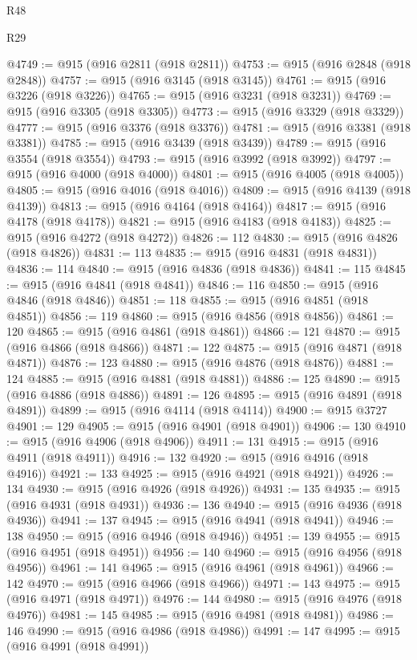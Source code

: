 \begin{lexlean}{R48}
\begin{lexlean}{R29}
\begin{coremodule}
{{{{{{{{{{{{{{{{{{{{{{{{{{{{{{{{{{{{{{{{{{{{{{{{{{{{{{{{{{{{{{{{{{{{{{{{{{{{{{{{{{{{{{{{{{{{{{{{{{{{{{{{{{{{{{{{{{{{{{{{{{{{{{{{{{{{{{{{{{{{{{{{{{{{{{{{{{{{{{{{{{{{{{{{{{{{{{{{{{{{{{{{{{{{{{{{{{{{{{{{{{{{{{{{{{{{{{{{{{@4749 := @915 (@916 @2811 (@918 @2811))
@4753 := @915 (@916 @2848 (@918 @2848))
@4757 := @915 (@916 @3145 (@918 @3145))
@4761 := @915 (@916 @3226 (@918 @3226))
@4765 := @915 (@916 @3231 (@918 @3231))
@4769 := @915 (@916 @3305 (@918 @3305))
@4773 := @915 (@916 @3329 (@918 @3329))
@4777 := @915 (@916 @3376 (@918 @3376))
@4781 := @915 (@916 @3381 (@918 @3381))
@4785 := @915 (@916 @3439 (@918 @3439))
@4789 := @915 (@916 @3554 (@918 @3554))
@4793 := @915 (@916 @3992 (@918 @3992))
@4797 := @915 (@916 @4000 (@918 @4000))
@4801 := @915 (@916 @4005 (@918 @4005))
@4805 := @915 (@916 @4016 (@918 @4016))
@4809 := @915 (@916 @4139 (@918 @4139))
@4813 := @915 (@916 @4164 (@918 @4164))
@4817 := @915 (@916 @4178 (@918 @4178))
@4821 := @915 (@916 @4183 (@918 @4183))
@4825 := @915 (@916 @4272 (@918 @4272))
@4826 := 112
@4830 := @915 (@916 @4826 (@918 @4826))
@4831 := 113
@4835 := @915 (@916 @4831 (@918 @4831))
@4836 := 114
@4840 := @915 (@916 @4836 (@918 @4836))
@4841 := 115
@4845 := @915 (@916 @4841 (@918 @4841))
@4846 := 116
@4850 := @915 (@916 @4846 (@918 @4846))
@4851 := 118
@4855 := @915 (@916 @4851 (@918 @4851))
@4856 := 119
@4860 := @915 (@916 @4856 (@918 @4856))
@4861 := 120
@4865 := @915 (@916 @4861 (@918 @4861))
@4866 := 121
@4870 := @915 (@916 @4866 (@918 @4866))
@4871 := 122
@4875 := @915 (@916 @4871 (@918 @4871))
@4876 := 123
@4880 := @915 (@916 @4876 (@918 @4876))
@4881 := 124
@4885 := @915 (@916 @4881 (@918 @4881))
@4886 := 125
@4890 := @915 (@916 @4886 (@918 @4886))
@4891 := 126
@4895 := @915 (@916 @4891 (@918 @4891))
@4899 := @915 (@916 @4114 (@918 @4114))
@4900 := @915 @3727
@4901 := 129
@4905 := @915 (@916 @4901 (@918 @4901))
@4906 := 130
@4910 := @915 (@916 @4906 (@918 @4906))
@4911 := 131
@4915 := @915 (@916 @4911 (@918 @4911))
@4916 := 132
@4920 := @915 (@916 @4916 (@918 @4916))
@4921 := 133
@4925 := @915 (@916 @4921 (@918 @4921))
@4926 := 134
@4930 := @915 (@916 @4926 (@918 @4926))
@4931 := 135
@4935 := @915 (@916 @4931 (@918 @4931))
@4936 := 136
@4940 := @915 (@916 @4936 (@918 @4936))
@4941 := 137
@4945 := @915 (@916 @4941 (@918 @4941))
@4946 := 138
@4950 := @915 (@916 @4946 (@918 @4946))
@4951 := 139
@4955 := @915 (@916 @4951 (@918 @4951))
@4956 := 140
@4960 := @915 (@916 @4956 (@918 @4956))
@4961 := 141
@4965 := @915 (@916 @4961 (@918 @4961))
@4966 := 142
@4970 := @915 (@916 @4966 (@918 @4966))
@4971 := 143
@4975 := @915 (@916 @4971 (@918 @4971))
@4976 := 144
@4980 := @915 (@916 @4976 (@918 @4976))
@4981 := 145
@4985 := @915 (@916 @4981 (@918 @4981))
@4986 := 146
@4990 := @915 (@916 @4986 (@918 @4986))
@4991 := 147
@4995 := @915 (@916 @4991 (@918 @4991))
}}}}}}}}}}}}}}}}}}}}}}}}}}}}}}}}}}}}}}}}}}}}}}}}}}}}}}}}}}}}}}}}}}}}}}}}}}}}}}}}}}}}}}}}}}}}}}}}}}}}}}}}}}}}}}}}}}}}}}}}}}}}}}}}}}}}}}}}}}}}}}}}}}}}}}}}}}}}}}}}}}}}}}}}}}}}}}}}}}}}}}}}}}}}}}}}}}}}}}}}}}}}}}}}}}}}}}}}}}
\end{coremodule}
\end{lexlean}
\end{lexlean}
